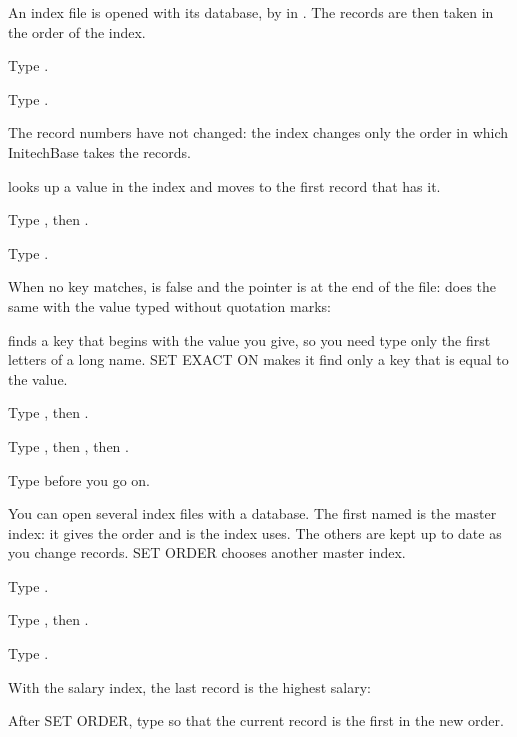 An index file is opened with its database, by  in .  The
records are then taken in the order of the index.
\begin{Steps}[resume]
\item Type .
\item Type .
\end{Steps}
The record numbers have not changed: the index changes only the order in which
InitechBase takes the records.

 looks up a value in the index and moves to the first record that has
it.
\begin{Steps}[resume]
\item Type , then .
\item Type .
\end{Steps}
When no key matches,  is false and the pointer is at the end of the
file:
 does the same with the value typed without quotation marks:

 finds a key that begins with the value you give, so you need type
only the first letters of a long name.  SET EXACT ON makes it find only a key
that is equal to the value.
\begin{Steps}[resume]
\item Type , then .
\item Type , then , then .
\end{Steps}
Type  before you go on.

You can open several index files with a database.  The first named is the
master index: it gives the order and is the index  uses.  The others
are kept up to date as you change records.  SET ORDER chooses another master
index.
\begin{Steps}[resume]
\item Type .
\item Type , then .
\item Type .
\end{Steps}
With the salary index, the last record is the highest salary:
\begin{Tip}
After SET ORDER, type  so that the current record is the first in
the new order.
\end{Tip}

